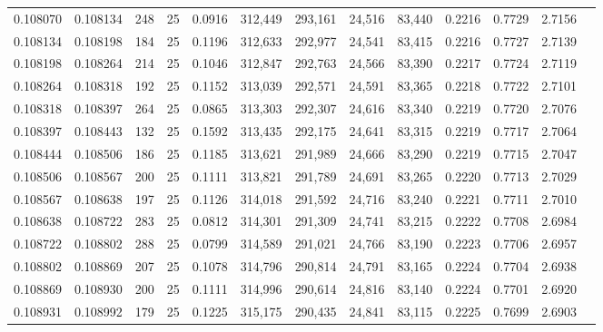 \begin{tabular}{rrrrrrrrrrrrr}
0.108070 & 0.108134 &   248 &  25 &                                     0.0916 & 312,449 & 293,161 &  24,516 &  83,440 & 0.2216 & 0.7729 & 2.7156 \\
0.108134 & 0.108198 &   184 &  25 &                                     0.1196 & 312,633 & 292,977 &  24,541 &  83,415 & 0.2216 & 0.7727 & 2.7139 \\
0.108198 & 0.108264 &   214 &  25 &                                     0.1046 & 312,847 & 292,763 &  24,566 &  83,390 & 0.2217 & 0.7724 & 2.7119 \\
0.108264 & 0.108318 &   192 &  25 &                                     0.1152 & 313,039 & 292,571 &  24,591 &  83,365 & 0.2218 & 0.7722 & 2.7101 \\
0.108318 & 0.108397 &   264 &  25 &                                     0.0865 & 313,303 & 292,307 &  24,616 &  83,340 & 0.2219 & 0.7720 & 2.7076 \\
0.108397 & 0.108443 &   132 &  25 &                                     0.1592 & 313,435 & 292,175 &  24,641 &  83,315 & 0.2219 & 0.7717 & 2.7064 \\
0.108444 & 0.108506 &   186 &  25 &                                     0.1185 & 313,621 & 291,989 &  24,666 &  83,290 & 0.2219 & 0.7715 & 2.7047 \\
0.108506 & 0.108567 &   200 &  25 &                                     0.1111 & 313,821 & 291,789 &  24,691 &  83,265 & 0.2220 & 0.7713 & 2.7029 \\
0.108567 & 0.108638 &   197 &  25 &                                     0.1126 & 314,018 & 291,592 &  24,716 &  83,240 & 0.2221 & 0.7711 & 2.7010 \\
0.108638 & 0.108722 &   283 &  25 &                                     0.0812 & 314,301 & 291,309 &  24,741 &  83,215 & 0.2222 & 0.7708 & 2.6984 \\
0.108722 & 0.108802 &   288 &  25 &                                     0.0799 & 314,589 & 291,021 &  24,766 &  83,190 & 0.2223 & 0.7706 & 2.6957 \\
0.108802 & 0.108869 &   207 &  25 &                                     0.1078 & 314,796 & 290,814 &  24,791 &  83,165 & 0.2224 & 0.7704 & 2.6938 \\
0.108869 & 0.108930 &   200 &  25 &                                     0.1111 & 314,996 & 290,614 &  24,816 &  83,140 & 0.2224 & 0.7701 & 2.6920 \\
0.108931 & 0.108992 &   179 &  25 &                                     0.1225 & 315,175 & 290,435 &  24,841 &  83,115 & 0.2225 & 0.7699 & 2.6903 \\

\end{tabular}
